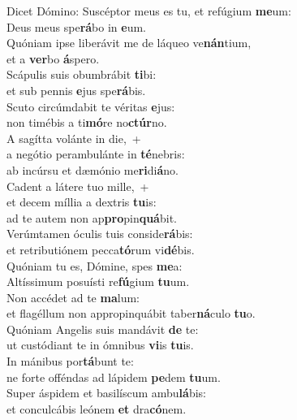 \evenverse Dicet Dómino: Suscéptor meus es tu, et refúgium \textbf{me}um:~\*\\
\evenverse Deus meus spe\textbf{rá}bo in \textbf{e}um.\\
\oddverse Quóniam ipse liberávit me de láqueo ve\textbf{nán}tium,~\*\\
\oddverse et a \textbf{ver}bo \textbf{á}spero.\\
\evenverse Scápulis suis obumbrábit \textbf{ti}bi:~\*\\
\evenverse et sub pennis \textbf{e}jus spe\textbf{rá}bis.\\
\oddverse Scuto circúmdabit te véritas \textbf{e}jus:~\*\\
\oddverse non timébis a ti\textbf{mó}re no\textbf{ctúr}no.\\
\evenverse A sagítta volánte in die,~+\\
\evenverse  a negótio perambulánte in \textbf{té}nebris:~\*\\
\evenverse ab incúrsu et dæmónio me\textbf{ri}di\textbf{á}no.\\
\oddverse Cadent a látere tuo mille,~+\\
\oddverse  et decem míllia a dextris \textbf{tu}is:~\*\\
\oddverse ad te autem non ap\textbf{pro}pin\textbf{quá}bit.\\
\evenverse Verúmtamen óculis tuis conside\textbf{rá}bis:~\*\\
\evenverse et retributiónem pecca\textbf{tó}rum vi\textbf{dé}bis.\\
\oddverse Quóniam tu es, Dómine, spes \textbf{me}a:~\*\\
\oddverse Altíssimum posuísti re\textbf{fú}gium \textbf{tu}um.\\
\evenverse Non accédet ad te \textbf{ma}lum:~\*\\
\evenverse et flagéllum non appropinquábit taber\textbf{ná}culo \textbf{tu}o.\\
\oddverse Quóniam Angelis suis mandávit \textbf{de} te:~\*\\
\oddverse ut custódiant te in ómnibus \textbf{vi}is \textbf{tu}is.\\
\evenverse In mánibus por\textbf{tá}bunt te:~\*\\
\evenverse ne forte offéndas ad lápidem \textbf{pe}dem \textbf{tu}um.\\
\oddverse Super áspidem et basilíscum ambu\textbf{lá}bis:~\*\\
\oddverse et conculcábis leónem \textbf{et} dra\textbf{có}nem.\\
